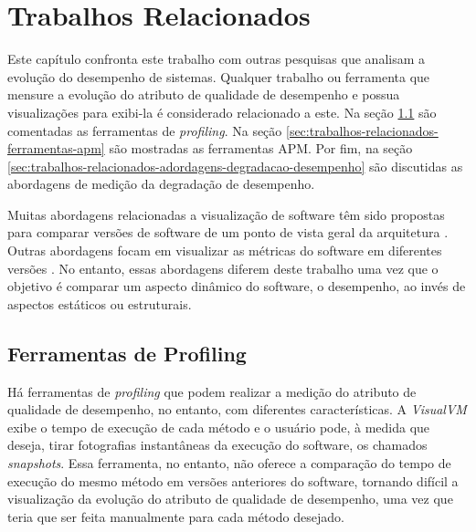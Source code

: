 \chapter{Trabalhos Relacionados} \label{ch:trabalhos-relacionados}

Este capítulo confronta este trabalho com outras pesquisas que analisam a evolução do desempenho de sistemas. Qualquer trabalho ou ferramenta que mensure a evolução do atributo de qualidade de desempenho e possua visualizações para exibi-la é considerado relacionado a este. Na seção \ref{sec:trabalhos-relacionados-ferramentas-profiling} são comentadas as ferramentas de \textit{profiling}. Na seção \ref{sec:trabalhos-relacionados-ferramentas-apm} são mostradas as ferramentas APM. Por fim, na seção \ref{sec:trabalhos-relacionados-adordagens-degradacao-desempenho} são discutidas as abordagens de medição da degradação de desempenho.

Muitas abordagens relacionadas a visualização de software têm sido propostas para comparar versões de software de um ponto de vista geral da arquitetura \cite{Steinbruckner2010b}\cite{Telea2008}\cite{Collberg2003}\cite{Eick1992}\cite{Holten2008}. Outras abordagens focam em visualizar as métricas do software em diferentes versões \cite{Langelier2008}\cite{Lanza2001}\cite{Pinzger2005}\cite{Wettel2008}. No entanto, essas abordagens diferem deste trabalho uma vez que o objetivo é comparar um aspecto dinâmico do software, o desempenho, ao invés de aspectos estáticos ou estruturais.

\section{Ferramentas de Profiling} \label{sec:trabalhos-relacionados-ferramentas-profiling}

Há ferramentas de \textit{profiling} que podem realizar a medição do atributo de qualidade de desempenho, no entanto, com diferentes características. A \textit{VisualVM} \cite{Vis} exibe o tempo de execução de cada método e o usuário pode, à medida que deseja, tirar fotografias instantâneas da execução do software, os chamados \textit{snapshots}. Essa ferramenta, no entanto, não oferece a comparação do tempo de execução do mesmo método em versões anteriores do software, tornando difícil a visualização da evolução do atributo de qualidade de desempenho, uma vez que teria que ser feita manualmente para cada método desejado.

